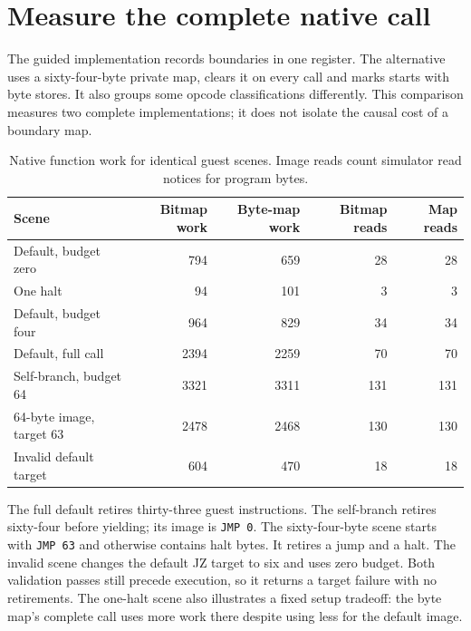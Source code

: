 \section{Measure the complete native call}\label{vm-measurement}
The guided implementation records boundaries in one register. The alternative uses a
sixty-four-byte private map, clears it on every call and marks starts with byte stores.
It also groups some opcode classifications differently. This comparison measures two
complete implementations; it does not isolate the causal cost of a boundary map.

\begin{table}[htbp]
  \centering
  \caption{Native function work for identical guest scenes. Image reads count simulator read notices for program bytes.}
  \begin{tabular}{lrrrr}
    \toprule
    Scene                    & Bitmap work & Byte-map work & Bitmap reads & Map reads \\
    \midrule
    Default, budget zero     & 794         & 659           & 28           & 28        \\
    One halt                 & 94          & 101           & 3            & 3         \\
    Default, budget four     & 964         & 829           & 34           & 34        \\
    Default, full call       & 2394        & 2259          & 70           & 70        \\
    Self-branch, budget 64   & 3321        & 3311          & 131          & 131       \\
    64-byte image, target 63 & 2478        & 2468          & 130          & 130       \\
    Invalid default target   & 604         & 470           & 18           & 18        \\
    \bottomrule
  \end{tabular}
\end{table}

The full default retires thirty-three guest instructions. The self-branch retires
sixty-four before yielding; its image is \texttt{JMP 0}. The sixty-four-byte scene
starts with \texttt{JMP 63} and otherwise contains halt bytes. It retires a jump and
a halt. The invalid scene changes the default JZ target to six and uses zero budget.
Both validation passes still precede execution, so it returns a target failure with
no retirements. The one-halt scene also illustrates a fixed setup tradeoff: the byte
map's complete call uses more work there despite using less for the default image.

